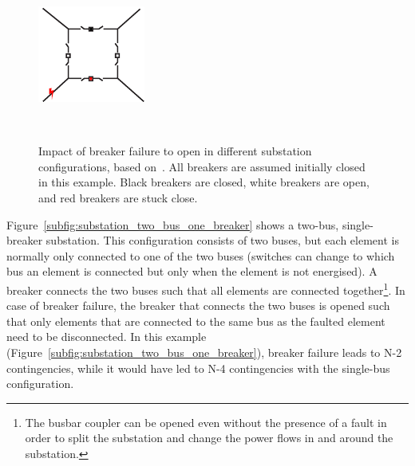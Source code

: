 \begin{figure}
{\begin{minipage}{0.45\linewidth}
            \centering
        \includegraphics[height=0.2\textheight]{Figs/BFP_ring.pdf}
        \end{minipage}
    \label{subfig:substation_ring}
    } \\  \baselineskip
     \hfill
    \caption{Impact of breaker failure to open in different substation configurations, based on~\cite{HorowitzBook}. All breakers are assumed initially closed in this example. Black breakers are closed, white breakers are open, and red breakers are stuck close.}
    \label{fig:substation}
\end{figure}

Figure~\ref{subfig:substation_two_bus_one_breaker} shows a two-bus, single-breaker substation. This configuration consists of two buses, but each element is normally only connected to one of the two buses (switches can change to which bus an element is connected but only when the element is not energised). A breaker connects the two buses such that all elements are connected together\footnote{The busbar coupler can be opened even without the presence of a fault in order to split the substation and change the power flows in and around the substation.}. In case of breaker failure, the breaker that connects the two buses is opened such that only elements that are connected to the same bus as the faulted element need to be disconnected. In this example (Figure~\ref{subfig:substation_two_bus_one_breaker}), breaker failure leads to N-2 contingencies, while it would have led to N-4 contingencies with the single-bus configuration.

